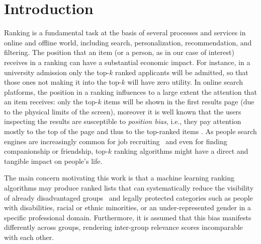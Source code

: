 \section{Introduction}\label{sec:introduction}
Ranking is a fundamental task at the basis of several processes and services in online and offline world, including search, personalization, recommendation, and filtering. 
%
The position that an item (or a person, as in our case of interest) receives in a ranking can have a substantial economic impact.
%
For instance, in a university admission only the top-$k$ ranked applicants will be admitted, so that those ones not making it into the top-$k$ will have zero utility. 
%
In online search platforms, the position in a ranking influences to a large extent the attention that an item receives: only the top-$k$ items will be shown in the first results page (due to the physical limits of the screen), moreover it is well known that the users inspecting the results are susceptible to \emph{position bias}, i.e., they pay attention mostly to the top of the page and thus to the top-ranked items \cite{CraswellZTR08}. 
%
As people search engines are increasingly common for job recruiting~\cite{raghavan2020mitigating} and even for finding companionship or friendship, top-$k$ ranking algorithms might have a direct and tangible impact on people's life.


The main concern motivating this work is that a machine learning ranking algorithms may produce ranked lists that can systematically reduce the visibility of already disadvantaged groups~\cite{peder2008,Dwork2012} and legally protected categories such as people with disabilities, racial or ethnic minorities, or an under-represented gender in a specific professional domain.
%
Furthermore, it is assumed that this bias manifests differently across groups, rendering inter-group relevance scores incomparable with each other.

